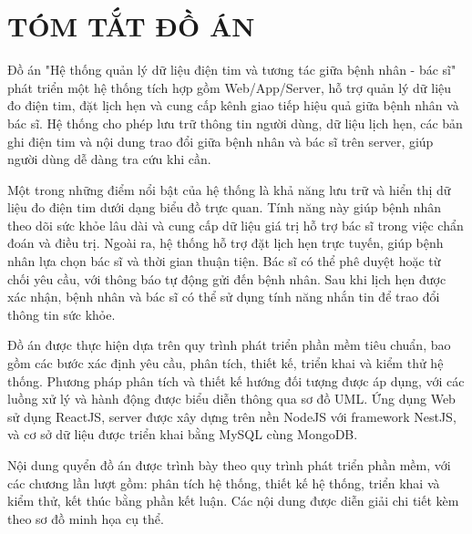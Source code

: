 \section*{TÓM TẮT ĐỒ ÁN}

Đồ án "Hệ thống quản lý dữ liệu điện tim và tương tác giữa bệnh nhân - bác sĩ" phát triển một hệ thống tích hợp gồm Web/App/Server, hỗ trợ quản lý dữ liệu đo điện tim, đặt lịch hẹn và cung cấp kênh giao tiếp hiệu quả giữa bệnh nhân và bác sĩ.
Hệ thống cho phép lưu trữ thông tin người dùng, dữ liệu lịch hẹn, các bản ghi điện tim và nội dung trao đổi giữa bệnh nhân và bác sĩ trên server, giúp người dùng dễ dàng tra cứu khi cần.

Một trong những điểm nổi bật của hệ thống là khả năng lưu trữ và hiển thị dữ liệu đo điện tim dưới dạng biểu đồ trực quan. Tính năng này giúp bệnh nhân theo dõi sức khỏe lâu dài và cung cấp dữ liệu giá trị hỗ trợ bác sĩ trong việc chẩn đoán và điều trị.
Ngoài ra, hệ thống hỗ trợ đặt lịch hẹn trực tuyến, giúp bệnh nhân lựa chọn bác sĩ và thời gian thuận tiện. Bác sĩ có thể phê duyệt hoặc từ chối yêu cầu, với thông báo tự động gửi đến bệnh nhân. Sau khi lịch hẹn được xác nhận, bệnh nhân và bác sĩ có thể sử dụng tính năng nhắn tin để trao đổi thông tin sức khỏe.

Đồ án được thực hiện dựa trên quy trình phát triển phần mềm tiêu chuẩn, bao gồm các bước xác định yêu cầu, phân tích, thiết kế, triển khai và kiểm thử hệ thống. Phương pháp phân tích và thiết kế hướng đối tượng được áp dụng, với các luồng xử lý và hành động được biểu diễn thông qua sơ đồ UML.
Ứng dụng Web sử dụng ReactJS, server được xây dựng trên nền NodeJS với framework NestJS, và cơ sở dữ liệu được triển khai bằng MySQL cùng MongoDB.

Nội dung quyển đồ án được trình bày theo quy trình phát triển phần mềm, với các chương lần lượt gồm: phân tích hệ thống, thiết kế hệ thống, triển khai và kiểm thử, kết thúc bằng phần kết luận. Các nội dung được diễn giải chi tiết kèm theo sơ đồ minh họa cụ thể.

\cleardoublepage



